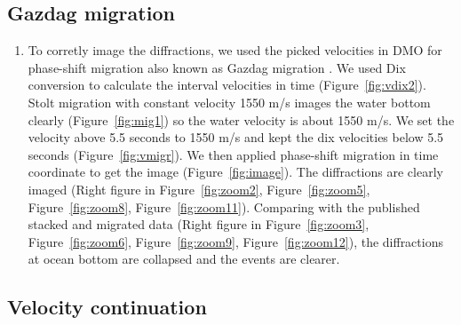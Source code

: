 \subsection{Gazdag migration}

\begin{enumerate}

\item To corretly image the diffractions, we used the picked velocities in DMO for phase-shift migration also known as Gazdag migration \cite[]{GEO43-07-13421351}. We used Dix conversion to calculate the interval velocities in time (Figure~\ref{fig:vdix2}). Stolt migration with constant velocity 1550 m/s images the water bottom clearly (Figure~\ref{fig:mig1}) so the water velocity is about 1550 m/s. We set the velocity above 5.5 seconds to 1550 m/s and kept the dix velocities below 5.5 seconds (Figure~\ref{fig:vmigr}). We then applied phase-shift migration in time coordinate to get the image (Figure~\ref{fig:image}). The diffractions are clearly imaged (Right figure in Figure~\ref{fig:zoom2}, Figure~\ref{fig:zoom5}, Figure~\ref{fig:zoom8}, Figure~\ref{fig:zoom11}). Comparing with the published stacked and migrated data (Right figure in Figure~\ref{fig:zoom3}, Figure~\ref{fig:zoom6}, Figure~\ref{fig:zoom9}, Figure~\ref{fig:zoom12}), the diffractions at ocean bottom are collapsed and the events are clearer.


\end{enumerate}\clearpage

\subsection{Velocity continuation}

